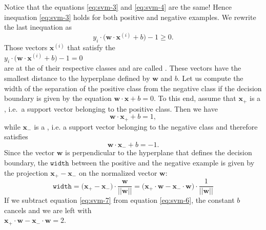 Notice that the equations \ref{eq:svm-3} and \ref{eq:svm-4} are the same!  Hence
inequation \ref{eq:svm-3} holds for both positive and negative examples.  We rewrite the last inequation as
\begin{equation}
  \label{eq:svm-5}
    y_i \cdot \bigl(\mathbf{w} \cdot \mathbf{x}^{(i)} + b\bigr) - 1 \geq 0.
\end{equation}
Those vectors $\mathbf{x}^{(i)}$ that satisfy the 
\\[0.2cm]
\hspace*{1.3cm}
$y_i \cdot \bigl(\mathbf{w} \cdot \mathbf{x}^{(i)} + b\bigr) - 1 = 0$
\\[0.2cm]
are at the  of their respective classes and are called .  These vectors
have the smallest distance to the hyperplane defined by $\mathbf{w}$ and $b$.  Let us compute the width of the
separation of the positive class from the negative class if the decision boundary is given by the equation
$\mathbf{w} \cdot \mathbf{x} + b = 0$.  To this end, assume that $\mathbf{x}_+$ is a ,
i.e.~a support vector belonging to the positive class.  Then we have
\begin{equation}
  \label{eq:svm-6}
  \mathbf{w} \cdot \mathbf{x}_+ + b = 1,  
\end{equation}
while $\mathbf{x}_-$ is a , i.e. a support vector belonging to the negative
class and therefore satisfies
\begin{equation}
  \label{eq:svm-7}
  \mathbf{w} \cdot \mathbf{x}_- + b = -1.  
\end{equation}
Since the vector $\mathbf{w}$ is perpendicular to the hyperplane that defines the decision boundary, the $\mathtt{width}$
between the positive and the negative example is given by the projection $\mathbf{x}_+ - \mathbf{x}_-$ on the normalized vector $\mathbf{w}$:
\begin{equation}
  \label{eq:svm-8}
 \mathtt{width} = \bigl(\mathbf{x}_+ - \mathbf{x}_-\bigr) \cdot \frac{\mathbf{w}}{||\mathbf{w}||} =
\bigl(\mathbf{x}_+ \cdot \mathbf{w} - \mathbf{x}_-\cdot \mathbf{w}\bigr) \cdot \frac{1}{||\mathbf{w}||}   
\end{equation}
If we subtract equation \ref{eq:svm-7} from equation \ref{eq:svm-6}, the constant $b$ cancels and we are left
with 
\\[0.2cm]
\hspace*{1.3cm}
$\mathbf{x}_+ \cdot \mathbf{w} - \mathbf{x}_- \cdot \mathbf{w} = 2$.  
\\[0.2cm]
